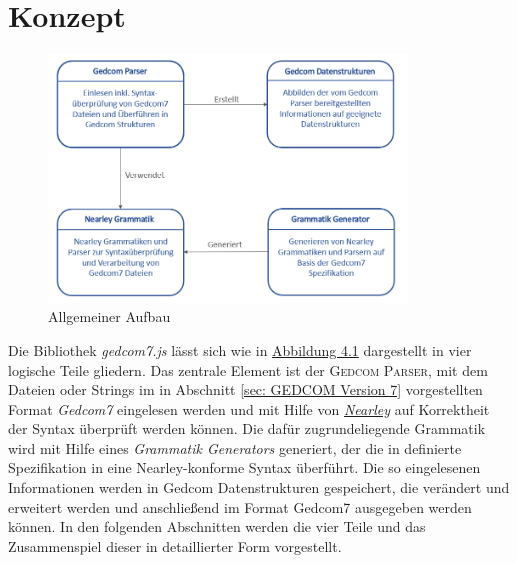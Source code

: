 \chapter{Konzept}
\label{chap: Konzept}

\begin{figure}[b]
	\centering
	\includegraphics[width=0.85\textwidth]{images/konzept_allgemein.png}
	\caption{Allgemeiner Aufbau}
	\label{fig: Allgemeiner Aufbau}
\end{figure}

Die Bibliothek \textit{gedcom7.js} lässt sich wie in \hyperref[fig: Allgemeiner Aufbau]{Abbildung 4.1} dargestellt in vier logische Teile gliedern. Das zentrale Element ist der \textsc{Gedcom Parser}, mit dem Dateien oder Strings im in Abschnitt \ref{sec: GEDCOM Version 7} vorgestellten Format \textit{Gedcom7} eingelesen werden und mit Hilfe von \hyperref[sec: Nearley]{\textit{Nearley}} auf Korrektheit der Syntax überprüft werden können. Die dafür zugrundeliegende Grammatik wird mit Hilfe eines \textit{Grammatik Generators} generiert, der die in \cite{GEDCOM} definierte Spezifikation in eine Nearley-konforme Syntax überführt. Die so eingelesenen Informationen werden in Gedcom Datenstrukturen gespeichert, die verändert und erweitert werden und anschließend im Format Gedcom7 ausgegeben werden können. In den folgenden Abschnitten werden die vier Teile und das Zusammenspiel dieser in detaillierter Form vorgestellt.

